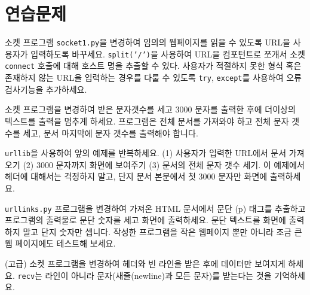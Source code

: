\section{연습문제}

\begin{ex}
소켓 프로그램 {\tt socket1.py}을 변경하여 임의의 웹페이지를 읽을 수 있도록 URL을 사용자가 입력하도록 바꾸세요.
{\tt split('/')}을 사용하여 URL을 컴포턴트로 쪼개서 소켓 {\tt connect} 호출에 대해 호스트 명을 추출할 수 있다.
사용자가 적절하지 못한 형식 혹은 존재하지 않는 URL을 입력하는 경우를 다룰 수 있도록 {\tt try}, {\tt except}를 사용하여 오류 검사기능을 추가하세요.
\end{ex}

\begin{ex}
소켓 프로그램을 변경하여 받은 문자갯수를 세고 3000 문자를 출력한 후에 더이상의 텍스트를 출력을 멈추게 하세요.
프로그램은 전체 문서를 가져와야 하고 전체 문자 갯수를 세고, 문서 마지막에 문자 갯수를 출력해야 합니다.
\end{ex}

\begin{ex}
{\tt urllib}을 사용하여 앞의 예제를 반복하세요. (1) 사용자가 입력한 URL에서 문서 가져오기
(2) 3000 문자까지 화면에 보여주기 (3) 문서의 전체 문자 갯수 세기.
이 예제에서 헤더에 대해서는 걱정하지 말고, 단지 문서 본문에서 첫 3000 문자만 화면에 출력하세요.
\end{ex}

\begin{ex} {\tt urllinks.py} 프로그램을 변경하여 가져온 HTML 문서에서 문단 (p) 태그를 추출하고
프로그램의 출력물로 문단 숫자를 세고 화면에 출력하세요. 문단 텍스트를 화면에 출력하지 말고 단지 숫자만 셉니다.
작성한 프로그램을 작은 웹페이지 뿐만 아니라 조금 큰 웹 페이지에도 테스트해 보세요.
\end{ex}

\begin{ex}
(고급) 소켓 프로그램을 변경하여 헤더와 빈 라인을 받은 후에 데이터만 보여지게 하세요.
{\tt recv}는 라인이 아니라 문자(새줄(newline)과 모든 문자)를 받는다는 것을 기억하세요.
\end{ex}


